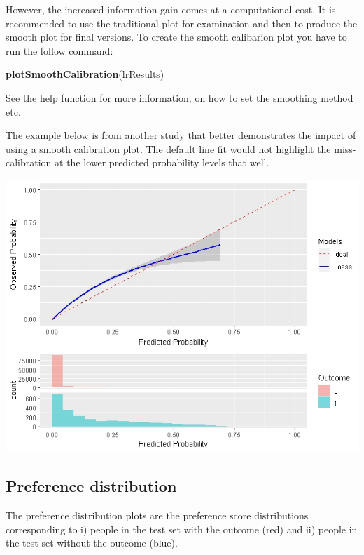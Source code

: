 \documentclass[]{book}
\newenvironment{Shaded}{\begin{snugshade}}{\end{snugshade}}
\newcommand{\KeywordTok}[1]{\textcolor[rgb]{0.13,0.29,0.53}{\textbf{#1}}}
\newcommand{\NormalTok}[1]{#1}
\begin{document}
However, the increased information gain comes at a computational cost.
It is recommended to use the traditional plot for examination and then
to produce the smooth plot for final versions. To create the smooth
calibarion plot you have to run the follow command:

\begin{Shaded}
\begin{Highlighting}[]
\KeywordTok{plotSmoothCalibration}\NormalTok{(lrResults)}
\end{Highlighting}
\end{Shaded}

See the help function for more information, on how to set the smoothing
method etc.

The example below is from another study that better demonstrates the
impact of using a smooth calibration plot. The default line fit would
not highlight the miss-calibration at the lower predicted probability
levels that well.

\includegraphics{images/PatientLevelPrediction/smoothCalibration.jpeg}

\newpage

\subsection{Preference distribution}\label{preference-distribution}

The preference distribution plots are the preference score distributions
corresponding to i) people in the test set with the outcome (red) and
ii) people in the test set without the outcome (blue).
\end{document}
